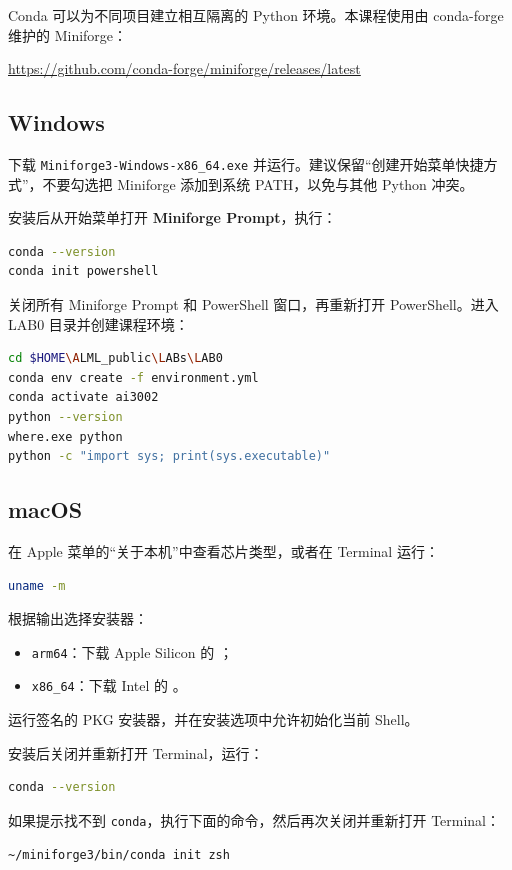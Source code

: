 \documentclass[11pt,a4paper]{article}
\newcommand{\windows}{\subsection*{\textcolor{windowsblue}{Windows}}}
\newcommand{\macos}{\subsection*{\textcolor{macgray}{macOS}}}
\begin{document}
Conda 可以为不同项目建立相互隔离的 Python 环境。本课程使用由 conda-forge 维护的 Miniforge：
\begin{center}
  \url{https://github.com/conda-forge/miniforge/releases/latest}
\end{center}

\windows

下载 \texttt{Miniforge3-Windows-x86\_64.exe} 并运行。建议保留“创建开始菜单快捷方式”，不要勾选把 Miniforge 添加到系统 PATH，以免与其他 Python 冲突。

安装后从开始菜单打开 \textbf{Miniforge Prompt}，执行：

\begin{lstlisting}[language=bash]
conda --version
conda init powershell
\end{lstlisting}

关闭所有 Miniforge Prompt 和 PowerShell 窗口，再重新打开 PowerShell。进入 LAB0 目录并创建课程环境：

\begin{lstlisting}[language=bash]
cd $HOME\ALML_public\LABs\LAB0
conda env create -f environment.yml
conda activate ai3002
python --version
where.exe python
python -c "import sys; print(sys.executable)"
\end{lstlisting}

\macos

在 Apple 菜单的“关于本机”中查看芯片类型，或者在 Terminal 运行：

\begin{lstlisting}[language=bash]
uname -m
\end{lstlisting}

根据输出选择安装器：
\begin{itemize}
  \item \texttt{arm64}：下载 Apple Silicon 的 ；
  \item \texttt{x86\_64}：下载 Intel 的 。
\end{itemize}
运行签名的 PKG 安装器，并在安装选项中允许初始化当前 Shell。

安装后关闭并重新打开 Terminal，运行：

\begin{lstlisting}[language=bash]
conda --version
\end{lstlisting}

如果提示找不到 \texttt{conda}，执行下面的命令，然后再次关闭并重新打开 Terminal：

\begin{lstlisting}[language=bash]
~/miniforge3/bin/conda init zsh
\end{lstlisting}
\end{document}

